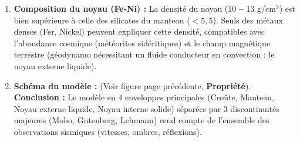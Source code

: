\documentclass[11pt]{article}
\begin{document}
\begin{exoresolu}
\begin{enumerate}
    \item \textbf{Composition du noyau (Fe-Ni) :}
    La densité du noyau ($10-13$ g/cm$^3$) est bien supérieure à celle des silicates du manteau ($< 5,5$). Seuls des métaux denses (Fer, Nickel) peuvent expliquer cette densité, compatibles avec l'abondance cosmique (météorites sidéritiques) et le champ magnétique terrestre (géodynamo nécessitant un fluide conducteur en convection : le noyau externe liquide).

    \item \textbf{Schéma du modèle :} (Voir figure page précédente, \textbf{Propriété}).
    \textbf{Conclusion :} Le modèle en 4 enveloppes principales (Croûte, Manteau, Noyau externe liquide, Noyau interne solide) séparées par 3 discontinuités majeures (Moho, Gutenberg, Lehmann) rend compte de l'ensemble des observations sismiques (vitesses, ombres, réflexions).
\end{enumerate}
\end{exoresolu}
\end{document}
